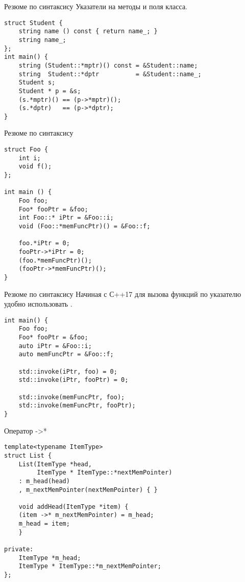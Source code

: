 \documentclass{beamer}
\begin{document}
\begin{frame}[fragile]{Резюме по синтаксису}
Указатели на методы и поля класса. 
    \begin{lstlisting}
struct Student { 
    string name () const { return name_; } 
    string name_;
};
int main() {
    string (Student::*mptr)() const = &Student::name;
    string  Student::*dptr          = &Student::name_;
    Student s;
    Student * p = &s;
    (s.*mptr)() == (p->*mptr)();
    (s.*dptr)   == (p->*dptr);
}
    \end{lstlisting}
\end{frame}

\begin{frame}[fragile]{Резюме по синтаксису}
    \begin{lstlisting}
struct Foo {
    int i;
    void f();
};

int main () {
    Foo foo;
    Foo* fooPtr = &foo;
    int Foo::* iPtr = &Foo::i;
    void (Foo::*memFuncPtr)() = &Foo::f;

    foo.*iPtr = 0;
    fooPtr->*iPtr = 0;
    (foo.*memFuncPtr)();
    (fooPtr->*memFuncPtr)();
}
    \end{lstlisting}
\end{frame}

\begin{frame}[fragile]{Резюме по синтаксису}
    Начиная с С++17 для вызова функций по указателю удобно использовать .
    \begin{lstlisting}
int main() {
    Foo foo;
    Foo* fooPtr = &foo;
    auto iPtr = &Foo::i;
    auto memFuncPtr = &Foo::f;

    std::invoke(iPtr, foo) = 0;
    std::invoke(iPtr, fooPtr) = 0;

    std::invoke(memFuncPtr, foo);
    std::invoke(memFuncPtr, fooPtr);
}
    \end{lstlisting}
\end{frame}

\begin{frame}[fragile]{Оператор ->*}
    \begin{lstlisting}
template<typename ItemType>
struct List {
    List(ItemType *head,
         ItemType * ItemType::*nextMemPointer)
    : m_head(head)
    , m_nextMemPointer(nextMemPointer) { }

    void addHead(ItemType *item) {
    (item ->* m_nextMemPointer) = m_head;
    m_head = item;
    }

private:
    ItemType *m_head;
    ItemType * ItemType::*m_nextMemPointer;
};
    \end{lstlisting}
\end{frame}
\end{document}

